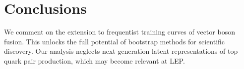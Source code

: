 \section{Conclusions}\label{sec:conclusions}

We comment on the extension to frequentist training curves of vector
boson fusion. This unlocks the full potential of bootstrap methods for
scientific discovery. Our analysis neglects next-generation latent
representations of top-quark pair production, which may become relevant
at LEP.

